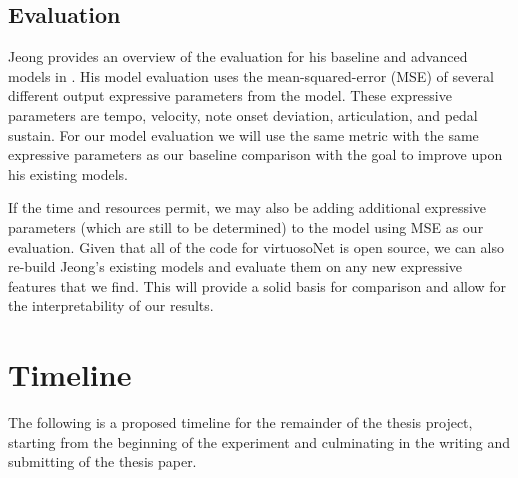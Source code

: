 \documentclass[letterpaper,12pt]{article}
\begin{document}
\subsection{Evaluation}
Jeong provides an overview of the evaluation for his baseline and advanced models in \cite{jeong2019virtuosonet}. His model evaluation uses the mean-squared-error (MSE) of several different output expressive parameters from the model. These expressive parameters are tempo, velocity, note onset deviation, articulation, and pedal sustain. For our model evaluation we will use the same metric with the same expressive parameters as our baseline comparison with the goal to improve upon his existing models. 

If the time and resources permit, we may also be adding additional expressive parameters (which are still to be determined) to the model using MSE as our evaluation. Given that all of the code for virtuosoNet is open source, we can also re-build Jeong's existing models and evaluate them on any new expressive features that we find. This will provide a solid basis for comparison and allow for the interpretability of our results. 

\section{Timeline}
The following is a proposed timeline for the remainder of the thesis project, starting from the beginning of the experiment and culminating in the writing and submitting of the thesis paper. 
\end{document}

